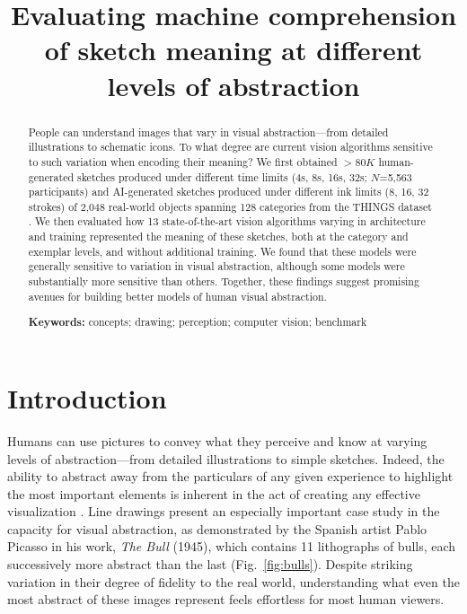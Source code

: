 \documentclass[10pt,letterpaper]{article}
\title{Evaluating machine comprehension of sketch meaning at different levels of abstraction}
\begin{document}


\maketitle
\begin{abstract}

People can understand images that vary in visual abstraction---from detailed illustrations to schematic icons. 
To what degree are current vision algorithms sensitive to such variation when encoding their meaning? 
We first obtained $>80K$ human-generated sketches produced under different time limits (4s, 8s, 16s, 32s; $N$=5,563 participants) and AI-generated sketches \cite{vinker2022clipasso} produced under different ink limits (8, 16, 32 strokes)  of 2,048 real-world objects spanning 128 categories from the THINGS dataset \cite{hebart2019things}.
We then evaluated how 13 state-of-the-art vision algorithms varying in architecture and training represented the meaning of these sketches, both at the category and exemplar levels, and without additional training.
We found that these models were generally sensitive to variation in visual abstraction, although some models were substantially more sensitive than others.
Together, these findings suggest promising avenues for building better models of human visual abstraction. 

\textbf{Keywords:} 
concepts; drawing; perception; computer vision; benchmark
\end{abstract}


\section{Introduction}

Humans can use pictures to convey what they perceive and know at varying levels of abstraction---from detailed illustrations to simple sketches.
Indeed, the ability to abstract away from the particulars of any given experience to highlight the most important elements is inherent in the act of creating any effective visualization \cite{viola2017pondering, chen2020foundations,mccloud1998understanding, mi2009abstraction, nan2011conjoining}.
Line drawings present an especially important case study in the capacity for visual abstraction, as demonstrated by the Spanish artist Pablo Picasso in his work, \textit{The Bull} (1945), which contains 11 lithographs of bulls, each successively more abstract than the last (Fig.~\ref{fig:bulls}).
Despite striking variation in their degree of fidelity to the real world, understanding what even the most abstract of these images represent feels effortless for most human viewers.
\end{document}
